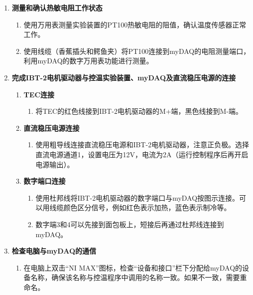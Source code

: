 \documentclass[dvipsnames, svgnames,a4paper,11pt]{article}
\begin{document}
        \begin{enumerate}
            \item \textbf{测量和确认热敏电阻工作状态}
            \begin{enumerate}
                \item 使用万用表测量实验装置的PT100热敏电阻的阻值，确认温度传感器正常工作。
                \item 使用线缆（香蕉插头和鳄鱼夹）将PT100连接到myDAQ的电阻测量端口，利用myDAQ的数字万用表功能进行测量。
            \end{enumerate}
            
            \item \textbf{完成IBT-2电机驱动器与控温实验装置、myDAQ及直流稳压电源的连接}
            \begin{enumerate}
                \item \textbf{TEC连接}
                \begin{enumerate}
                    \item 将TEC的红色线接到IBT-2电机驱动器的M+端，黑色线接到M-端。
                \end{enumerate}
                
                \item \textbf{直流稳压电源连接}
                \begin{enumerate}
                    \item 使用粗导线连接直流稳压电源和IBT-2电机驱动器，注意正负极。选择直流电源通道1，设置电压为12V，电流为2A（运行控制程序后再开启电源输出）。
                \end{enumerate}
                
                \item \textbf{数字端口连接}
                \begin{enumerate}
                    \item 使用杜邦线将IBT-2电机驱动器的数字端口与myDAQ按图示连接。可以用线缆颜色区分信号，例如红色表示加热，蓝色表示制冷等。
                    \item 数字端3和4可以先接到面包板上，短接后再通过杜邦线连接到myDAQ。
                \end{enumerate}
            \end{enumerate}
            
            \item \textbf{检查电脑与myDAQ的通信}
            \begin{enumerate}
                \item 在电脑上双击“NI MAX”图标，检查“设备和接口”栏下分配给myDAQ的设备名称，确保该名称与控温程序中调用的名称一致。如果不一致，需要重命名。
            \end{enumerate}
        \end{enumerate}
\end{document}
